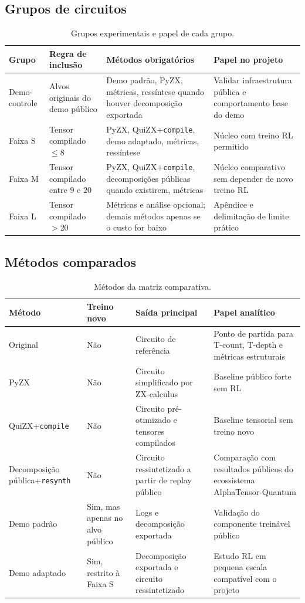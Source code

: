 \documentclass[a4paper,11pt]{article}
\begin{document}
\subsection*{Grupos de circuitos}

\begin{table}[ht]
\centering
\caption{Grupos experimentais e papel de cada grupo.}
\label{tab:groups}
\begin{tabularx}{\textwidth}{p{} p{} Y Y}
\toprule
Grupo & Regra de inclusão & Métodos obrigatórios & Papel no projeto \\
\midrule
Demo-controle & Alvos originais do demo público & Demo padrão, PyZX, métricas, ressíntese quando houver decomposição exportada & Validar infraestrutura pública e comportamento base do demo \\
Faixa S & Tensor compilado $\leq 8$ & PyZX, QuiZX+\texttt{compile}, demo adaptado, métricas, ressíntese & Núcleo com treino RL permitido \\
Faixa M & Tensor compilado entre $9$ e $20$ & PyZX, QuiZX+\texttt{compile}, decomposições públicas quando existirem, métricas & Núcleo comparativo sem depender de novo treino RL \\
Faixa L & Tensor compilado $>20$ & Métricas e análise opcional; demais métodos apenas se o custo for baixo & Apêndice e delimitação de limite prático \\
\bottomrule
\end{tabularx}
\end{table}

\subsection*{Métodos comparados}

\begin{table}[ht]
\centering
\caption{Métodos da matriz comparativa.}
\label{tab:methods}
\begin{tabularx}{\textwidth}{p{} p{} Y Y}
\toprule
Método & Treino novo & Saída principal & Papel analítico \\
\midrule
Original & Não & Circuito de referência & Ponto de partida para T-count, T-depth e métricas estruturais \\
PyZX & Não & Circuito simplificado por ZX-calculus & Baseline público forte sem RL \\
QuiZX+\texttt{compile} & Não & Circuito pré-otimizado e tensores compilados & Baseline tensorial sem treino novo \\
Decomposição pública+\texttt{resynth} & Não & Circuito ressintetizado a partir de replay público & Comparação com resultados públicos do ecossistema AlphaTensor-Quantum \\
Demo padrão & Sim, mas apenas no alvo público & Logs e decomposição exportada & Validação do componente treinável público \\
Demo adaptado & Sim, restrito à Faixa S & Decomposição exportada e circuito ressintetizado & Estudo RL em pequena escala compatível com o projeto \\
\bottomrule
\end{tabularx}
\end{table}
\end{document}

